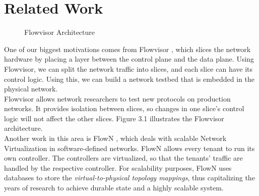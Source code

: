 \chapter{Related Work}
\begin{figure}
	\noindent
	\caption{Flowvisor Architecture}
\end{figure}
One of our biggest motivations comes from Flowvisor \cite{flowvisor}, which slices the network hardware by placing a layer between the control plane and the data plane. Using  Flowvisor, we can split the network traffic into slices, and each slice can have its control logic. Using this, we can build a network testbed that is embedded in the physical network. \\
Flowvisor allows network researchers to test new protocols on production networks. It provides isolation between slices, so changes in one slice's control logic will not affect the other slices. Figure 3.1 illustrates the Flowvisor architecture. \\

Another work in this area is FlowN \cite{flown}, which deals with scalable Network Virtualization in software-defined networks. FlowN allows every tenant to run its own controller. The controllers are virtualized, so that the tenants' traffic are handled by the respective controller. For scalability purposes, FlowN uses databases to store the \emph{virtual-to-physical topology mappings}, thus capitalizing the years of research to achieve durable state and a highly scalable system.
